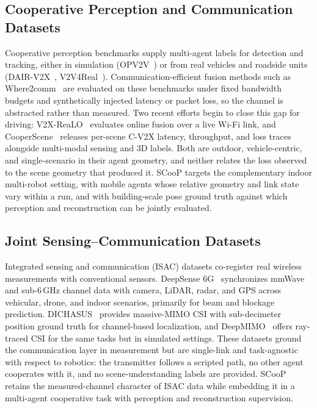 \documentclass[journal]{IEEEtran}
\begin{document}
\subsection{Cooperative Perception and Communication Datasets}
Cooperative perception benchmarks supply multi-agent labels for
detection and tracking, either in simulation (OPV2V~\cite{opv2v}) or
from real vehicles and roadside units (DAIR-V2X~\cite{dairv2x},
V2V4Real~\cite{v2v4real}). Communication-efficient fusion methods such
as Where2comm~\cite{where2comm} are evaluated on these benchmarks
under fixed bandwidth budgets and synthetically injected latency or
packet loss, so the channel is abstracted rather than measured. Two
recent efforts begin to close this gap for driving:
V2X-ReaLO~\cite{v2xrealo} evaluates online fusion over a live Wi-Fi
link, and CooperScene~\cite{cooperscene} releases per-scene C-V2X
latency, throughput, and loss traces alongside multi-modal sensing
and 3D labels. Both are outdoor, vehicle-centric, and single-scenario
in their agent geometry, and neither relates the loss observed to the
scene geometry that produced it. SCooP targets the complementary
indoor multi-robot setting, with mobile agents whose relative geometry
and link state vary within a run, and with building-scale pose ground
truth against which perception and reconstruction can be jointly
evaluated.

\subsection{Joint Sensing--Communication Datasets}
Integrated sensing and communication (ISAC) datasets co-register real
wireless measurements with conventional sensors. DeepSense
6G~\cite{deepsense6g} synchronizes mmWave and sub-6\,GHz channel data
with camera, LiDAR, radar, and GPS across vehicular, drone, and indoor
scenarios, primarily for beam and blockage prediction.
DICHASUS~\cite{dichasus} provides massive-MIMO CSI with sub-decimeter
position ground truth for channel-based localization, and
DeepMIMO~\cite{deepmimo} offers ray-traced CSI for the same tasks but
in simulated settings. These datasets ground the communication layer
in measurement but are single-link and task-agnostic with respect to
robotics: the transmitter follows a scripted path, no other agent
cooperates with it, and no scene-understanding labels are provided.
SCooP retains the measured-channel character of ISAC data while
embedding it in a multi-agent cooperative task with perception and
reconstruction supervision.
\end{document}
